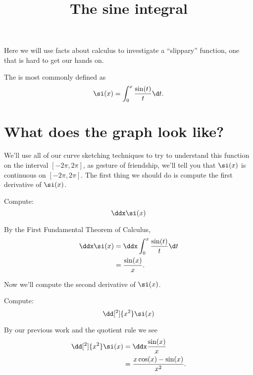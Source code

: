 \documentclass{ximera}
\title[Dig-In:]{The sine integral}
\begin{document}
\begin{abstract}
\end{abstract}
\maketitle

Here we will use facts about calculus to investigate a ``slippary''
function, one that is hard to get our hands on.

\begin{definition}
  The  is most commonly defined as
  \[
  \si(x) = \int_0^x \frac{\sin(t)}{t}\d t.
  \]
\end{definition}


\section{What does the graph look like?}

We'll use all of our curve sketching techniques to try to understand
this function on the interval $[-2\pi,2\pi]$, as gesture of
friendship, we'll tell you that $\si(x)$ is continuous on
$[-2\pi,2\pi]$.  The first thing we should do is compute the first
derivative of $\si(x)$.

\begin{example}
  Compute:
  \[
  \ddx \si(x)
  \]
  \begin{explanation}
    By the First Fundamental Theorem of Calculus,
    \begin{align*}
    \ddx \si(x) &= \ddx \int_0^x \frac{\sin(t)}{t}\d t\\
    &=\frac{\sin(x)}{x}.
    \end{align*}
  \end{explanation}
\end{example}

Now we'll compute the second derivative of $\si(x)$.

\begin{example}
  Compute:
  \[
  \dd[^2]{x^2}\si(x)
  \]
  \begin{explanation}
    By our previous work and the quotient rule we see
    \begin{align*}
      \dd[^2]{x^2} \si(x) &= \ddx \frac{\sin(x)}{x}\\
      &=\frac{x\cos(x) -\sin(x)}{x^2}.
    \end{align*}
  \end{explanation}
\end{example}
\end{document}
